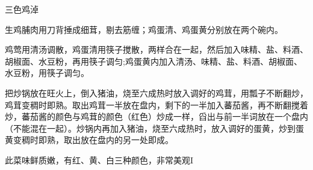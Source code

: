 \begin{recipe}{三色鸡淖}

\ingredients


\cooking

\step 生鸡脯肉用刀背捶成细茸，剔去筋缠；鸡蛋清、鸡蛋黄分别放在两个碗内。

\step 鸡莺用清汤调散，鸡蛋清用筷子搅散，两样合在一起，然后加入味精、盐、料酒、胡椒面、水豆粉，再用筷子调匀;鸡蛋黄内加入清汤、味精、盐、料酒、胡椒面、水豆粉，用筷子调匀。

\step 把炒锅放在旺火上，倒入猪油，烧至六成热时放入调好的鸡茸，用瓢子不断翻炒，鸡茸变稠时即熟。取出鸡茸一半放在盘内，剩下的一半加入蕃茄酱，再不断翻搅着炒，蕃茄酱的颜色与鸡茸的颜色（红色）炒成一样，舀出与前一半词放在一个盘内（不能混在一起）。炒锅内再加入猪油，烧至六成热时，放入调好的蛋黄，炒到蛋黄变稠时即熟，取出放在盘内的另一处即成。

\notes

此菜味鲜质嫩，有红、黄、白三种颜色，非常美观I

\end{recipe}

